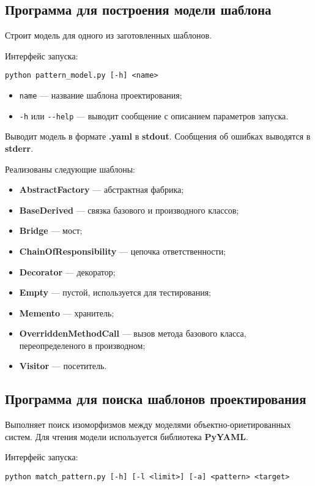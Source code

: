 \subsection{Программа для построения модели шаблона}

Строит модель для одного из заготовленных шаблонов.

Интерфейс запуска:
\begin{verbatim}
python pattern_model.py [-h] <name>
\end{verbatim}

\begin{itemize}
\item \verb;name; --- название шаблона проектирования;
\item \verb;-h; или \verb;--help; --- выводит сообщение с описанием параметров
запуска.
\end{itemize}

Выводит модель в формате \textbf{.yaml} в \textbf{stdout}.
Сообщения об ошибках выводятся в \textbf{stderr}.

Реализованы следующие шаблоны:
\begin{itemize}
\item \textbf{AbstractFactory} --- абстрактная фабрика;
\item \textbf{BaseDerived} --- связка базового и производного классов;
\item \textbf{Bridge} --- мост;
\item \textbf{ChainOfResponsibility} --- цепочка ответственности;
\item \textbf{Decorator} --- декоратор;
\item \textbf{Empty} --- пустой, используется для тестирования;
\item \textbf{Memento} --- хранитель;
\item \textbf{OverriddenMethodCall} --- вызов метода базового класса,
переопределеного в производном;
\item \textbf{Visitor} --- посетитель.
\end{itemize}

\subsection{Программа для поиска шаблонов проектирования}

Выполняет поиск изоморфизмов между моделями объектно-ориетированных систем.
Для чтения модели используется библиотека \textbf{PyYAML}.

Интерфейс запуска:
\begin{verbatim}
python match_pattern.py [-h] [-l <limit>] [-a] <pattern> <target>
\end{verbatim}


